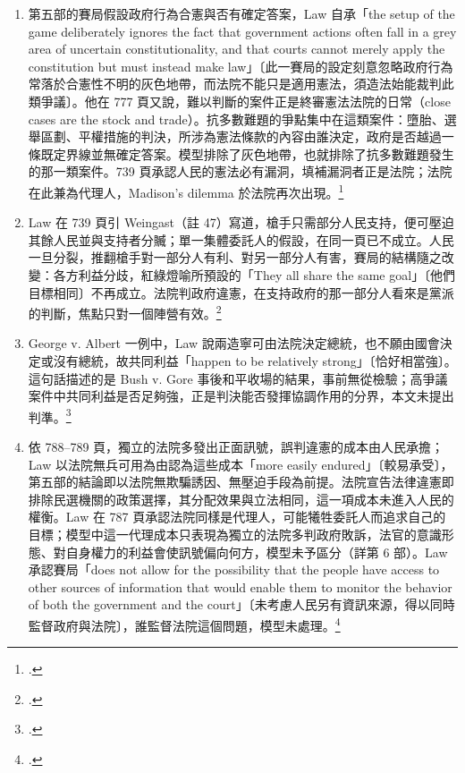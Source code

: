 \begin{enumerate}
\tightlist
\item
  第五部的賽局假設政府行為合憲與否有確定答案，Law 自承「the setup of the game deliberately ignores the fact that government actions often fall in a grey area of uncertain constitutionality, and that courts cannot merely apply the constitution but must instead make law」〔此一賽局的設定刻意忽略政府行為常落於合憲性不明的灰色地帶，而法院不能只是適用憲法，須造法始能裁判此類爭議〕。他在 777 頁又說，難以判斷的案件正是終審憲法法院的日常（close cases are the stock and trade）。抗多數難題的爭點集中在這類案件：墮胎、選舉區劃、平權措施的判決，所涉為憲法條款的內容由誰決定，政府是否越過一條既定界線並無確定答案。模型排除了灰色地帶，也就排除了抗多數難題發生的那一類案件。739 頁承認人民的憲法必有漏洞，填補漏洞者正是法院；法院在此兼為代理人，Madison's dilemma 於法院再次出現。\footcite[739, 777, 790]{law2009}
\item
  Law 在 739 頁引 Weingast（註 47）寫道，槍手只需部分人民支持，便可壓迫其餘人民並與支持者分贓；單一集體委託人的假設，在同一頁已不成立。人民一旦分裂，推翻槍手對一部分人有利、對另一部分人有害，賽局的結構隨之改變：各方利益分歧，紅綠燈喻所預設的「They all share the same goal」〔他們目標相同〕不再成立。法院判政府違憲，在支持政府的那一部分人看來是黨派的判斷，焦點只對一個陣營有效。\footcite[739, 770]{law2009}
\item
  George v. Albert 一例中，Law 說兩造寧可由法院決定總統，也不願由國會決定或沒有總統，故共同利益「happen to be relatively strong」〔恰好相當強〕。這句話描述的是 Bush v. Gore 事後和平收場的結果，事前無從檢驗；高爭議案件中共同利益是否足夠強，正是判決能否發揮協調作用的分界，本文未提出判準。\footcite[763]{law2009}
\item
  依 788--789 頁，獨立的法院多發出正面訊號，誤判違憲的成本由人民承擔；Law 以法院無兵可用為由認為這些成本「more easily endured」〔較易承受〕，第五部的結論即以法院無欺騙誘因、無壓迫手段為前提。法院宣告法律違憲即排除民選機關的政策選擇，其分配效果與立法相同，這一項成本未進入人民的權衡。Law 在 787 頁承認法院同樣是代理人，可能犧牲委託人而追求自己的目標；模型中這一代理成本只表現為獨立的法院多判政府敗訴，法官的意識形態、對自身權力的利益會使訊號偏向何方，模型未予區分（詳第 6 部）。Law 承認賽局「does not allow for the possibility that the people have access to other sources of information that would enable them to monitor the behavior of both the government and the court」〔未考慮人民另有資訊來源，得以同時監督政府與法院〕，誰監督法院這個問題，模型未處理。\footcite[788--790]{law2009}

\end{enumerate}
